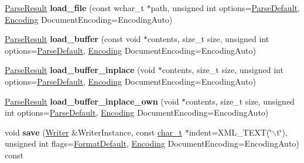 \begin{DoxyCompactItemize}
\item 
\hypertarget{classphys_1_1xml_1_1Document_ad5414d48e539468d9caefd846eb78845}{
\hyperlink{structphys_1_1xml_1_1ParseResult}{ParseResult} {\bfseries load\_\-file} (const wchar\_\-t $\ast$path, unsigned int options=\hyperlink{namespacephys_1_1xml_aa6b8f7f8c2322fd683a235b498834d60}{ParseDefault}, \hyperlink{namespacephys_1_1xml_a420f5de782438f88160321385bea2015}{Encoding} DocumentEncoding=EncodingAuto)}
\label{dd/d44/classphys_1_1xml_1_1Document_ad5414d48e539468d9caefd846eb78845}

\item 
\hypertarget{classphys_1_1xml_1_1Document_a92ce092d1b7ea617a02ebbcbb7e30437}{
\hyperlink{structphys_1_1xml_1_1ParseResult}{ParseResult} {\bfseries load\_\-buffer} (const void $\ast$contents, size\_\-t size, unsigned int options=\hyperlink{namespacephys_1_1xml_aa6b8f7f8c2322fd683a235b498834d60}{ParseDefault}, \hyperlink{namespacephys_1_1xml_a420f5de782438f88160321385bea2015}{Encoding} DocumentEncoding=EncodingAuto)}
\label{dd/d44/classphys_1_1xml_1_1Document_a92ce092d1b7ea617a02ebbcbb7e30437}

\item 
\hypertarget{classphys_1_1xml_1_1Document_a86aac9113528f2f91a07b408366cc5b9}{
\hyperlink{structphys_1_1xml_1_1ParseResult}{ParseResult} {\bfseries load\_\-buffer\_\-inplace} (void $\ast$contents, size\_\-t size, unsigned int options=\hyperlink{namespacephys_1_1xml_aa6b8f7f8c2322fd683a235b498834d60}{ParseDefault}, \hyperlink{namespacephys_1_1xml_a420f5de782438f88160321385bea2015}{Encoding} DocumentEncoding=EncodingAuto)}
\label{dd/d44/classphys_1_1xml_1_1Document_a86aac9113528f2f91a07b408366cc5b9}

\item 
\hypertarget{classphys_1_1xml_1_1Document_a54ae4f27f7d4aef70f68e1c771fc1720}{
\hyperlink{structphys_1_1xml_1_1ParseResult}{ParseResult} {\bfseries load\_\-buffer\_\-inplace\_\-own} (void $\ast$contents, size\_\-t size, unsigned int options=\hyperlink{namespacephys_1_1xml_aa6b8f7f8c2322fd683a235b498834d60}{ParseDefault}, \hyperlink{namespacephys_1_1xml_a420f5de782438f88160321385bea2015}{Encoding} DocumentEncoding=EncodingAuto)}
\label{dd/d44/classphys_1_1xml_1_1Document_a54ae4f27f7d4aef70f68e1c771fc1720}

\item 
\hypertarget{classphys_1_1xml_1_1Document_a90c83e9875639c0979cc6846353f0bf7}{
void {\bfseries save} (\hyperlink{classphys_1_1xml_1_1Writer}{Writer} \&WriterInstance, const \hyperlink{namespacephys_1_1xml_afc87705cd1c2917d87b879715a2d8f6e}{char\_\-t} $\ast$indent=XML\_\-TEXT(\char`\"{}$\backslash$t\char`\"{}), unsigned int flags=\hyperlink{namespacephys_1_1xml_a08bf6aab51f79929d9097706a5e64408}{FormatDefault}, \hyperlink{namespacephys_1_1xml_a420f5de782438f88160321385bea2015}{Encoding} DocumentEncoding=EncodingAuto) const }
\label{dd/d44/classphys_1_1xml_1_1Document_a90c83e9875639c0979cc6846353f0bf7}


\end{DoxyCompactItemize}
